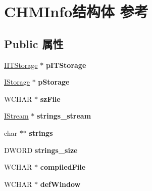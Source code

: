 \hypertarget{struct_c_h_m_info}{}\section{C\+H\+M\+Info结构体 参考}
\label{struct_c_h_m_info}
\subsection*{Public 属性}
\begin{DoxyCompactItemize}
\item 
\mbox{\label{struct_c_h_m_info_ac6458922da3a68b09ba8f6c5af32263e}} 
\hyperlink{interface_i_i_t_storage}{I\+I\+T\+Storage} $\ast$ {\bfseries p\+I\+T\+Storage}
\item 
\mbox{\label{struct_c_h_m_info_a2ddb509c63da230fb1bf5254c0558bad}} 
\hyperlink{interface_i_storage}{I\+Storage} $\ast$ {\bfseries p\+Storage}
\item 
\mbox{\label{struct_c_h_m_info_af196061727c7366689398686e56f9fb0}} 
W\+C\+H\+AR $\ast$ {\bfseries sz\+File}
\item 
\mbox{\label{struct_c_h_m_info_ae8b505216f29e3932816b498fb035f3f}} 
\hyperlink{interface_i_stream}{I\+Stream} $\ast$ {\bfseries strings\+\_\+stream}
\item 
\mbox{\label{struct_c_h_m_info_a74009fe9809fe07f1352697eebbf1060}} 
char $\ast$$\ast$ {\bfseries strings}
\item 
\mbox{\label{struct_c_h_m_info_a616e47ac4ec52a52b21e07b3ffd844de}} 
D\+W\+O\+RD {\bfseries strings\+\_\+size}
\item 
\mbox{\label{struct_c_h_m_info_a88cee728a0b4f3269e249ad301d9b226}} 
W\+C\+H\+AR $\ast$ {\bfseries compiled\+File}
\item 
\mbox{\label{struct_c_h_m_info_af86098aaddf547ce6d67a95e930fe6ab}} 
W\+C\+H\+AR $\ast$ {\bfseries def\+Window}
\item 
\mbox{\label{struct_c_h_m_info_a2a4330612d1869ff1acb13c0b8195aaa}} 
$$
\end{DoxyCompactItemize}
